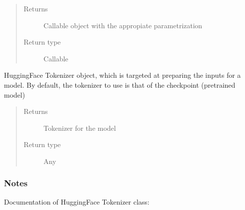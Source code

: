 \documentclass[letterpaper,10pt,english]{sphinxmanual}
\begin{document}
\begin{fulllineitems}
\begin{fulllineitems}
\begin{quote}
\begin{description}
\item[{Returns}] \leavevmode
\sphinxAtStartPar
Callable object with the appropiate parametrization

\item[{Return type}] \leavevmode
\sphinxAtStartPar
Callable

\end{description}\end{quote}

\end{fulllineitems}


\begin{fulllineitems}
\label{\detokenize{code:gpt2_summarizer.GPT2Summarizer.tokenizer}}
\sphinxAtStartPar
HuggingFace Tokenizer object, which is targeted at preparing the inputs for a model.
By default, the tokenizer to use is that of the checkpoint (pre\sphinxhyphen{}trained model)
\begin{quote}\begin{description}
\item[{Returns}] \leavevmode
\sphinxAtStartPar
Tokenizer for the model

\item[{Return type}] \leavevmode
\sphinxAtStartPar
Any

\end{description}\end{quote}
\subsubsection*{Notes}

\sphinxAtStartPar
Documentation of HuggingFace Tokenizer class: 

\end{fulllineitems}



\end{fulllineitems}
\end{document}
